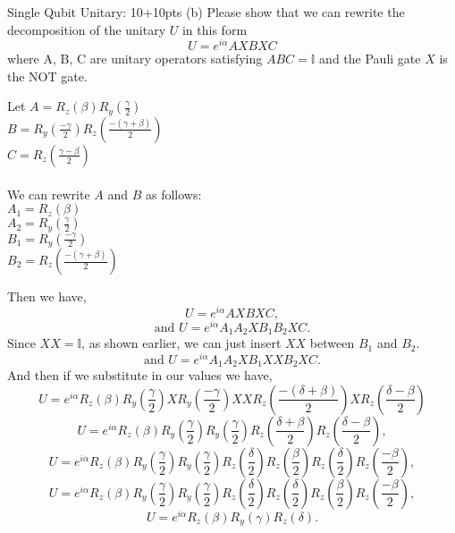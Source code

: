 \documentclass[12pt]{article}
\makeatletter
\newcommand{\<}{\langle}
\renewcommand{\>}{\rangle}
\newenvironment{problem}{\@startsection
       {section}
       {1}
       {-.2em}
       {-3.5ex plus -1ex minus -.2ex}
       {2.3ex plus .2ex}
       {\pagebreak[3]
       \large\bf\noindent{Problem }
       }
       }
       {%
       \begin{center}\large\bf \end{center}}
\makeatother
\begin{document}
\begin{problem}{Single Qubit Unitary: 10+10pts}
(b)   Please show that we can rewrite the decomposition of the unitary $U$ in this form 
\[
	U = e^{i\alpha} AXBXC
\]
where A, B, C are unitary operators satisfying $ABC=\mathbb{I}$ and the Pauli gate $X$ is the NOT gate.\\
\begin{multicols}{2}
Let $A = R_z(\beta)R_y(\frac{\gamma}{2})$\\
\hspace*{1.35cm}$B = R_y(\frac{-\gamma}{2})R_z(\frac{-(\gamma+\beta)}{2})$\\
\hspace*{1.35cm}$C = R_z(\frac{\gamma-\beta}{2})$\\
\columnbreak \\
We can rewrite $A$ and $B$ as follows:\\
$A_1 = R_z(\beta)$\\
$A_2 = R_y(\frac{\gamma}{2})$\\
$B_1 = R_y(\frac{-\gamma}{2})$\\
$B_2 = R_z(\frac{-(\gamma+\beta)}{2})$\\
\end{multicols}
Then we have,
$$U = e^{i\alpha} AXBXC,$$
$$\text{and }U = e^{i\alpha}A_1A_2XB_1B_2XC.$$
Since $XX = \mathbb{I}$, as shown earlier, we can just insert $XX$ between $B_1$ and $B_2$.
$$\text{and }U = e^{i\alpha}A_1A_2XB_1XXB_2XC.$$
And then if we substitute in our values we have,
$$U = e^{i\alpha}R_z \left( \beta \right) R_y\left(\frac{\gamma}{2}\right)XR_y\left(\frac{-\gamma}{2}\right)XXR_z\left(\frac{-(\delta+\beta)}{2}\right)XR_z\left(\frac{\delta-\beta}{2}\right)$$
$$U = e^{i\alpha}R_z \left( \beta \right) R_y\left(\frac{\gamma}{2}\right)R_y\left(\frac{\gamma}{2}\right)R_z\left(\frac{\delta+\beta}{2}\right)R_z\left(\frac{\delta-\beta}{2}\right),$$
$$U = e^{i\alpha}R_z \left( \beta \right) R_y\left(\frac{\gamma}{2}\right)R_y\left(\frac{\gamma}{2}\right)R_z\left(\frac{\delta}{2}\right)R_z\left(\frac{\beta}{2}\right)R_z \left( \frac{\delta}{2} \right) R_z \left( \frac{-\beta}{2} \right),$$
$$U = e^{i\alpha}R_z \left( \beta \right) R_y \left( \frac{\gamma}{2} \right) R_y \left( \frac{\gamma}{2} \right) R_z \left( \frac{\delta}{2} \right) R_z \left( \frac{\delta}{2} \right) R_z \left( \frac{\beta}{2} \right) R_z \left( \frac{-\beta}{2} \right),$$
$$U = e^{i\alpha}R_z \left( \beta \right) R_y \left( \gamma \right) R_z\left( \delta \right).$$
\end{problem}
\end{document}
